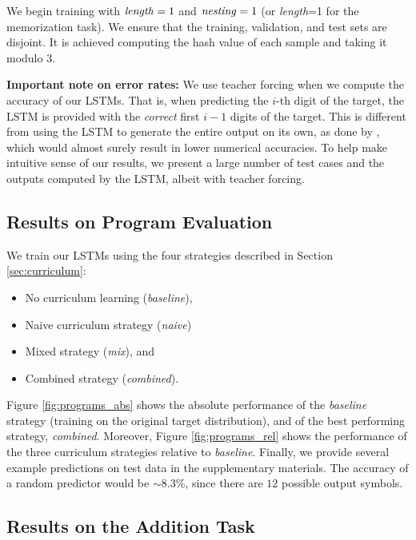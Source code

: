 We begin training with $\text{\textit{length}}=1$ and $\text{\textit{nesting}}=1$ (or 
\textit{length}=1 for the memorization task).  We ensure that the training, validation, and test sets are disjoint. It is achieved computing the hash value of each sample and taking it modulo 3.

{\bf Important note on error rates:} We use teacher forcing  when we compute the accuracy of our LSTMs. That is, when predicting the $i$-th digit of the target, the LSTM is provided with the \emph{correct} first $i-1$ digits of the target.  This is different from using the LSTM to generate the entire output on its own, as done by \cite{sutskever2014sequence}, which would almost surely result in lower numerical accuracies.  To help make intuitive sense of our results, we present a large number of test cases and the outputs computed by the LSTM, albeit with teacher forcing.  

\subsection{Results on Program Evaluation}
\label{sec:programs_res}

We train our LSTMs using the four strategies described in Section \ref{sec:curriculum}:

\begin{itemize}
  \item No curriculum learning (\textit{baseline}),
  \item Naive curriculum strategy (\textit{naive})
  \item Mixed strategy  (\textit{mix}), and \item Combined strategy (\textit{combined}).
\end{itemize}

Figure \ref{fig:programs_abs} shows the absolute performance of the \textit{baseline} strategy (training on the original target distribution), and of the best performing strategy, \textit{combined}. Moreover, Figure 
\ref{fig:programs_rel} shows the performance of the three curriculum strategies relative to
\textit{baseline}. Finally, we provide several example predictions on test data in the supplementary materials. The accuracy of a random predictor would be $\sim 8.3\%$, since there are $12$ possible output symbols.  

\subsection{Results on the Addition Task}

